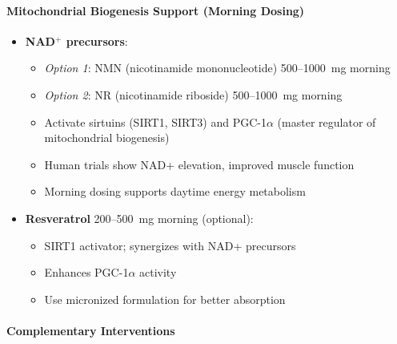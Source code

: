 \paragraph{Mitochondrial Biogenesis Support (Morning Dosing)}

\begin{itemize}
    \item \textbf{NAD$^+$ precursors}:
    \begin{itemize}
        \item \textit{Option 1}: NMN (nicotinamide mononucleotide) 500--1000~mg morning
        \item \textit{Option 2}: NR (nicotinamide riboside) 500--1000~mg morning
        \item Activate sirtuins (SIRT1, SIRT3) and PGC-1$\alpha$ (master regulator of mitochondrial biogenesis)
        \item Human trials show NAD+ elevation, improved muscle function
        \item Morning dosing supports daytime energy metabolism
    \end{itemize}

    \item \textbf{Resveratrol} 200--500~mg morning (optional):
    \begin{itemize}
        \item SIRT1 activator; synergizes with NAD+ precursors
        \item Enhances PGC-1$\alpha$ activity
        \item Use micronized formulation for better absorption
    \end{itemize}
\end{itemize}

\paragraph{Complementary Interventions}

